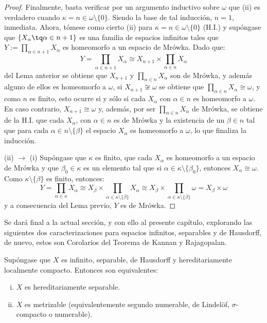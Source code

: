 \begin{proof}
		Finalmente, basta verificar por un argumento inductivo sobre $\omega$ que (ii) es verdadero cuando $\kappa=n \in \omega \setminus \{0\}$. Siendo la base de tal inducción, $n=1$, inmediata. Ahora, tómese como cierto (ii) para $\kappa=n \in \omega \setminus \{0\}$ (H.I.) y supóngase que $\{X_\alpha \tq \alpha \in n+1\}$ es una familia de espacios infinitos tales que $Y:=\prod_{\alpha \in n+1} X_\alpha$ es homeomorfo a un espacio de Mrówka. Dado que:
		$$ Y = \prod_{\alpha \in n+1} X_\alpha \cong X_{n+1} \times \prod_{\alpha \in n } X_\alpha $$
		del Lema anterior se obtiene que $X_{n+1}$ y $\prod_{\alpha \in n } X_\alpha$ son de Mrówka, y además alguno de ellos es homeomorfo a $\omega$, si $X_{n+1} \not\cong \omega$ se obtiene que $\prod_{\alpha \in n } X_\alpha \cong \omega$, y como $n$ es finito, esto ocurre si y sólo si cada $X_\alpha$ con $\alpha \in n$ es homeomorfo a $\omega$. En caso contrario, $X_{n+1} \cong \omega$ y, además, por ser $\prod_{\alpha \in n } X_\alpha$ de Mrówka, se obtiene de la H.I. que cada $X_\alpha$, con $\alpha \in n$ es de Mrówka y la existencia de un $\beta \in n$ tal que para cada $\alpha \in n \setminus \{\beta\}$ el espacio $X_\alpha$ es homeomorfo a $\omega$, lo que finaliza la inducción.
		
		(ii) $\to$ (i) Supóngase que $\kappa$ es finito, que cada $X_\alpha$ es homeomorfo a un espacio de Mrówka y que $\beta_0 \in \kappa$ es un elemento tal que si $\alpha \in \kappa \setminus \{\beta_0\}$, entonces $X_\alpha \cong \omega$. Como $\kappa \setminus \{\beta\}$ es finito, entonces:
		$$ Y = \prod_{\alpha \in \kappa} X_\alpha \cong X_\beta \times \prod_{\alpha \in \kappa \setminus \{\beta\}} X_\alpha \cong X_\beta \times \prod_{\alpha \in \kappa \setminus \{\beta\}} \omega = X_\beta \times \omega $$
		y a consecuencia del Lema previo, $Y$ es de Mrówka.
	\end{proof}
	
	Se dará final a la actual sección, y con ello al presente capítulo, explorando las siguientes dos caracterizaciones para espacios infinitos, separables y de Hausdorff, de nuevo, estos son Corolarios del Teorema de Kannan y Rajagopalan.
	
	\begin{corolario}
		Supóngase que $X$ es infinito, separable, de Hausdorff y hereditariamente localmente compacto. Entonces son equivalentes:
		\begin{enumerate}[i)]
			\item $X$ es hereditariamente separable.
			\item $X$ es metrizable (equivalentemente segundo numerable, de Lindelöf, $\sigma$-compacto o numerable).
		\end{enumerate}
	\end{corolario}
	
